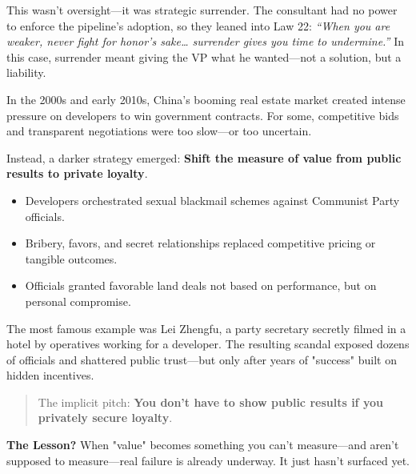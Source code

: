 This wasn’t oversight—it was strategic surrender. The consultant had no power to enforce the pipeline’s adoption, so they leaned into Law 22: \textit{“When you are weaker, never fight for honor’s sake… surrender gives you time to undermine.”} In this case, surrender meant giving the VP what he wanted—not a solution, but a liability.

\begin{tcolorbox}[colback=blue!5!white, colframe=blue!50!black, breakable, title={Historical Sidebar: When ROI Becomes Loyalty --- China's Real Estate Blackmail Scandals}]

In the 2000s and early 2010s, China's booming real estate market created intense pressure on developers to win government contracts.  
For some, competitive bids and transparent negotiations were too slow—or too uncertain.

\medskip

Instead, a darker strategy emerged:  
\textbf{Shift the measure of value from public results to private loyalty}.

\medskip

\begin{itemize}
    \item Developers orchestrated sexual blackmail schemes against Communist Party officials.
    \item Bribery, favors, and secret relationships replaced competitive pricing or tangible outcomes.
    \item Officials granted favorable land deals not based on performance, but on personal compromise.
\end{itemize}

\medskip

The most famous example was Lei Zhengfu, a party secretary secretly filmed in a hotel by operatives working for a developer.  
The resulting scandal exposed dozens of officials and shattered public trust—but only after years of "success" built on hidden incentives.

\medskip

\begin{quote}
The implicit pitch: \textbf{You don't have to show public results if you privately secure loyalty}.
\end{quote}

\medskip

\textbf{The Lesson?} When "value" becomes something you can't measure—and aren't supposed to measure—real failure is already underway. It just hasn't surfaced yet.
\end{tcolorbox}

